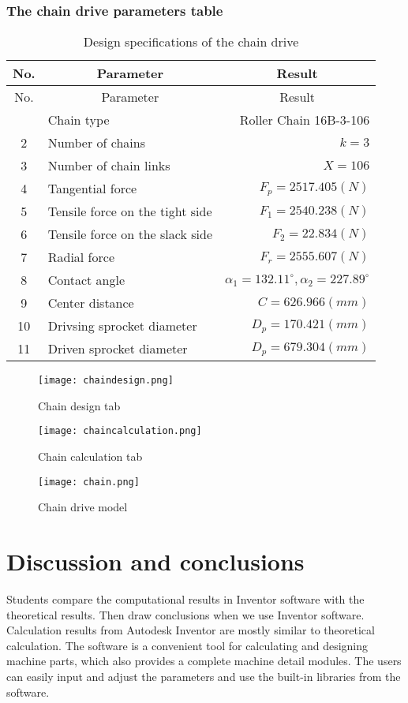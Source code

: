 \subsubsection{The chain drive parameters table}
\begin{center}
	\begin{longtable}{clr}
		\toprule
		No. & \multicolumn{1}{c}{Parameter} & \multicolumn{1}{c}{Result}\\
		\midrule\endfirsthead
		\toprule
		No. & \multicolumn{1}{c}{Parameter} & \multicolumn{1}{c}{Result}\\
		\midrule\endhead
		\bottomrule\endfoot
		\bottomrule
		\caption{Design specifications of the chain drive}
		\endlastfoot
		1 & Chain type & Roller Chain 16B-3-106\\
		2 & Number of chains & $ k=3 $\\
		3 & Number of chain links & $ X=106 $\\
		4 & Tangential force &$ F_p=2517.405\unit{(N)} $ \\
		5 & Tensile force on the tight side & $ F_1 =2540.238\unit{(N)}$\\
		6 & Tensile force on the slack side & $ F_2 = 22.834\unit{(N)} $\\
		7 & Radial force &$ F_r =2555.607\unit{(N)}$ \\
		8 & Contact angle & $ \alpha_1=132.11^\circ,\alpha_2=227.89^\circ $\\
		9 & Center distance &$ C= 626.966\unit{(mm)}$ \\
		10 & Drivsing sprocket diameter & $ D_{p} =170.421\unit{(mm)}$ \\
		11 & Driven sprocket diameter & $ D_{p} =679.304\unit{(mm)}$\\
	\end{longtable}
\end{center}
\begin{figure}
	\centering
	\texttt{[image: chaindesign.png]}
	\caption{Chain design tab}
	\label{chaindesign}
\end{figure}
\begin{figure}
	\centering
	\texttt{[image: chaincalculation.png]}
	\caption{Chain calculation tab}
	\label{chaincalculation}
\end{figure}
\begin{figure}
	\centering
	\texttt{[image: chain.png]}
	\caption{Chain drive model}
	\label{chain}
\end{figure}

\section{Discussion and conclusions}
Students compare the computational results in Inventor software with the theoretical results. Then draw conclusions when we use Inventor software.\\
Calculation results from Autodesk Inventor are mostly similar to theoretical calculation. The software is a convenient tool for calculating and designing machine parts, which also provides a complete machine detail modules. The users can easily input and adjust the parameters and use the built-in libraries from the software.
